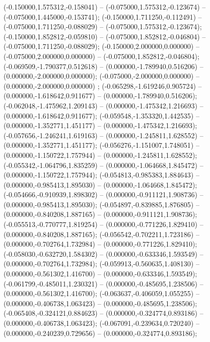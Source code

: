  (-0.150000,1.575312,-0.158041) -- (-0.075000,1.575312,-0.123674) -- (-0.075000,1.445000,-0.153741);
 (-0.150000,1.711250,-0.112491) -- (-0.075000,1.711250,-0.088029) -- (-0.075000,1.575312,-0.123674);
 (-0.150000,1.852812,-0.059810) -- (-0.075000,1.852812,-0.046804) -- (-0.075000,1.711250,-0.088029);
 (-0.150000,2.000000,0.000000) -- (-0.075000,2.000000,0.000000) -- (-0.075000,1.852812,-0.046804);
 (-0.069509,-1.790377,0.512618) -- (0.000000,-1.789940,0.516206) -- (0.000000,-2.000000,0.000000);
 (-0.075000,-2.000000,0.000000) -- (0.000000,-2.000000,0.000000) ;
 (-0.065298,-1.619246,0.905724) -- (0.000000,-1.618642,0.911677) -- (0.000000,-1.789940,0.516206);
 (-0.062048,-1.475962,1.209143) -- (0.000000,-1.475342,1.216693) -- (0.000000,-1.618642,0.911677);
 (-0.059548,-1.353320,1.442535) -- (0.000000,-1.352771,1.451177) -- (0.000000,-1.475342,1.216693);
 (-0.057656,-1.246241,1.619163) -- (0.000000,-1.245811,1.628552) -- (0.000000,-1.352771,1.451177);
 (-0.056276,-1.151007,1.748051) -- (0.000000,-1.150722,1.757944) -- (0.000000,-1.245811,1.628552);
 (-0.055342,-1.064796,1.835259) -- (0.000000,-1.064668,1.845472) -- (0.000000,-1.150722,1.757944);
 (-0.054813,-0.985383,1.884643) -- (0.000000,-0.985413,1.895030) -- (0.000000,-1.064668,1.845472);
 (-0.054666,-0.910939,1.898302) -- (0.000000,-0.911121,1.908736) -- (0.000000,-0.985413,1.895030);
 (-0.054897,-0.839885,1.876805) -- (0.000000,-0.840208,1.887165) -- (0.000000,-0.911121,1.908736);
 (-0.055513,-0.770777,1.819254) -- (0.000000,-0.771226,1.829410) -- (0.000000,-0.840208,1.887165);
 (-0.056542,-0.702211,1.723186) -- (0.000000,-0.702764,1.732984) -- (0.000000,-0.771226,1.829410);
 (-0.058030,-0.632720,1.584302) -- (0.000000,-0.633346,1.593549) -- (0.000000,-0.702764,1.732984);
 (-0.059913,-0.560635,1.408130) -- (0.000000,-0.561302,1.416700) -- (0.000000,-0.633346,1.593549);
 (-0.061799,-0.485011,1.230321) -- (0.000000,-0.485695,1.238506) -- (0.000000,-0.561302,1.416700);
 (-0.063637,-0.406059,1.055255) -- (0.000000,-0.406738,1.063423) -- (0.000000,-0.485695,1.238506);
 (-0.065408,-0.324121,0.884623) -- (0.000000,-0.324774,0.893186) -- (0.000000,-0.406738,1.063423);
 (-0.067091,-0.239634,0.720240) -- (0.000000,-0.240239,0.729656) -- (0.000000,-0.324774,0.893186);
